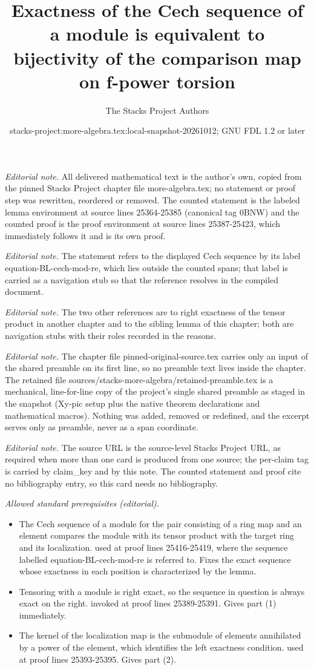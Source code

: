 \documentclass[10pt,a4paper]{amsart}
\title{Exactness of the Cech sequence of a module is equivalent to bijectivity of the comparison map on f-power torsion}
\author{The Stacks Project Authors}
\date{stacks-project:more-algebra.tex:local-snapshot-20261012; GNU FDL 1.2 or later}
\theoremstyle{plain}
\theoremstyle{definition}
\theoremstyle{remark}
\numberwithin{equation}{subsection}
\begin{document}
\maketitle
\setcounter{subsection}{1}
\noindent\textit{Editorial note.} All delivered mathematical text is the author's own, copied from the pinned Stacks Project chapter file more-algebra.tex; no statement or proof step was rewritten, reordered or removed. The counted statement is the labeled lemma environment at source lines 25364-25385 (canonical tag 0BNW) and the counted proof is the proof environment at source lines 25387-25423, which immediately follows it and is its own proof.\par\medskip
\noindent\textit{Editorial note.} The statement refers to the displayed Cech sequence by its label equation-BL-cech-mod-re, which lies outside the counted spans; that label is carried as a navigation stub so that the reference resolves in the compiled document.\par\medskip
\noindent\textit{Editorial note.} The two other references are to right exactness of the tensor product in another chapter and to the sibling lemma of this chapter; both are navigation stubs with their roles recorded in the reasons.\par\medskip
\noindent\textit{Editorial note.} The chapter file pinned-original-source.tex carries only an input of the shared preamble on its first line, so no preamble text lives inside the chapter. The retained file sources/stacks-more-algebra/retained-preamble.tex is a mechanical, line-for-line copy of the project's single shared preamble as staged in the snapshot (Xy-pic setup plus the native theorem declarations and mathematical macros). Nothing was added, removed or redefined, and the excerpt serves only as preamble, never as a span coordinate.\par\medskip
\noindent\textit{Editorial note.} The source URL is the source-level Stacks Project URL, as required when more than one card is produced from one source; the per-claim tag is carried by claim\_key and by this note. The counted statement and proof cite no bibliography entry, so this card needs no bibliography.\par\medskip
\noindent\textit{Allowed standard prerequisites (editorial).}\begin{itemize}
\item The Cech sequence of a module for the pair consisting of a ring map and an element compares the module with its tensor product with the target ring and its localization. used at proof lines 25416-25419, where the sequence labelled equation-BL-cech-mod-re is referred to. Fixes the exact sequence whose exactness in each position is characterized by the lemma.
\item Tensoring with a module is right exact, so the sequence in question is always exact on the right. invoked at proof lines 25389-25391. Gives part (1) immediately.
\item The kernel of the localization map is the submodule of elements annihilated by a power of the element, which identifies the left exactness condition. used at proof lines 25393-25395. Gives part (2).
\end{itemize}\medskip
\end{document}

